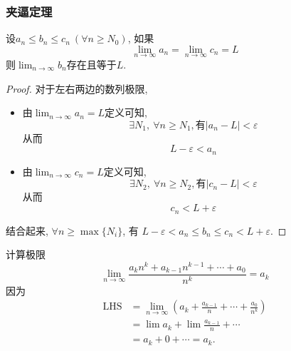 \subsubsection{夹逼定理}
\begin{theorem}
    设$a_n\le b_n\le c_n \ (\forall n \ge N_0 )$, 如果
    \begin{equation}
        \lim_{n \to \infty}a_n = \lim_{n \to \infty} c_n = L
    \end{equation}
    则$\displaystyle \lim_{n \to \infty} b_n$存在且等于$L$.
\end{theorem}
\begin{proof}
  对于左右两边的数列极限,
  \begin{itemize}
    \item 由$\displaystyle \lim_{n \to \infty}a_n = L$定义可知, 
    \begin{equation}
      \exists N_1,\ \forall n\ge N_1, \text{有} \left| a_n - L \right| < \varepsilon
    \end{equation}
    从而
    \begin{equation}
      L -\varepsilon < a_n
    \end{equation}

    \item 由$\displaystyle \lim_{n \to \infty}c_n = L$定义可知, 
    \begin{equation}
      \exists N_2,\ \forall n\ge N_2, \text{有} \left| c_n - L \right| < \varepsilon
    \end{equation}
    从而
    \begin{equation}
      c_n < L+\varepsilon
    \end{equation}
  \end{itemize}
    
    结合起来, $\forall  n \ge \max \{ N_i \}$, 有 $L-\varepsilon < a_n \le b_n \le c_n < L+\varepsilon$.
\end{proof}

\begin{example}
    计算极限
    \begin{equation}
      \lim_{n \to \infty} \frac{a_k n^{k} + a_{k-1}n^{k-1} + \cdots + a_0}{n^{k}} = a_k
    \end{equation}
    因为
    \begin{align}
        \text{LHS} & = \lim_{n \to \infty}\left( a_k + \frac{a_{k-1}}{n} + \cdots + \frac{a_0}{n^{k}} \right) 
        \\
        & = \lim a_k + \lim \frac{a_{k-1}}{n} + \cdots 
        \\
        & = a_k + 0 + \cdots = a_k.
    \end{align}
\end{example}

